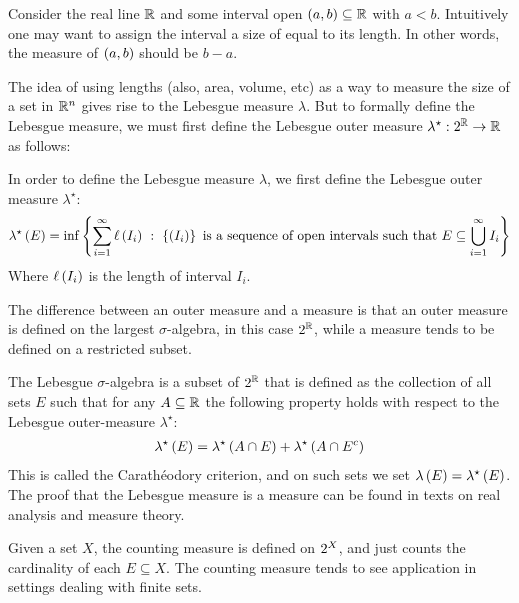 \begin{example}
  Consider the real line \(\mathbb{R}\)
  and some interval open \(\left(a, b\right) \subseteq \mathbb{R}\) with \(a < b\).
  Intuitively one may want to assign the interval a size of
  equal to its length.
  In other words, the measure of \(\left(a, b\right)\) should be \(b - a\).

  The idea of using lengths (also, area, volume, etc) as a way to measure
  the size of a set in \(\mathbb{R}^n\) gives rise to the Lebesgue measure
  \(\lambda\).
  But to formally define the Lebesgue measure, we must first
  define the Lebesgue outer measure
  \(\lambda^\star : 2^{\mathbb{R}} \to \mathbb{R}\) as follows:
  
  In order to define the Lebesgue measure \(\lambda\),
  we first define the Lebesgue outer measure \(\lambda^\star\):
  \begin{align*}
    \lambda^\star \parens{E}
      = \inf\braces{\sum_{i = 1}^{\infty} \ell\parens{I_i} \st
                      \braces{\parens{I_i}}
                      \ \text{is a sequence of open intervals such that} \ 
                      E \subseteq \bigcup_{i = 1}^{\infty} {I_i}}
  \end{align*}
  Where \(\ell\left(I_i\right)\) is the length of interval \(I_i\).

  The difference between an outer measure and a measure is that
  an outer measure is defined on the largest \(\sigma\)-algebra,
  in this case \(2^{\mathbb{R}}\),
  while a measure tends to be defined on a restricted subset.

  The Lebesgue \(\sigma\)-algebra is a subset of \(2^{\mathbb{R}}\) that
  is defined as the collection of all sets \(E\) such that
  for any \(A \subseteq \mathbb{R}\) the following property holds with respect
  to the Lebesgue outer-measure \(\lambda^\star\):
  \begin{align*}
    \lambda^\star \left(E\right)
      = \lambda^\star \left(A \cap E\right) + \lambda^\star \left(A \cap E^c\right)
  \end{align*}
  This is called the Carath{\'e}odory criterion,
  and on such sets we set \(\lambda\left(E\right) = \lambda^\star \left(E\right)\).
  The proof that the Lebesgue measure is a measure can be found
  in texts on real analysis and measure theory.

\end{example}



\begin{example}
  Given a set \(X\),
  the counting measure is defined on \(2^{X}\),
  and just counts the cardinality of each \(E \subseteq X\).
  The counting measure tends to see application in settings
  dealing with finite sets.
\end{example}

